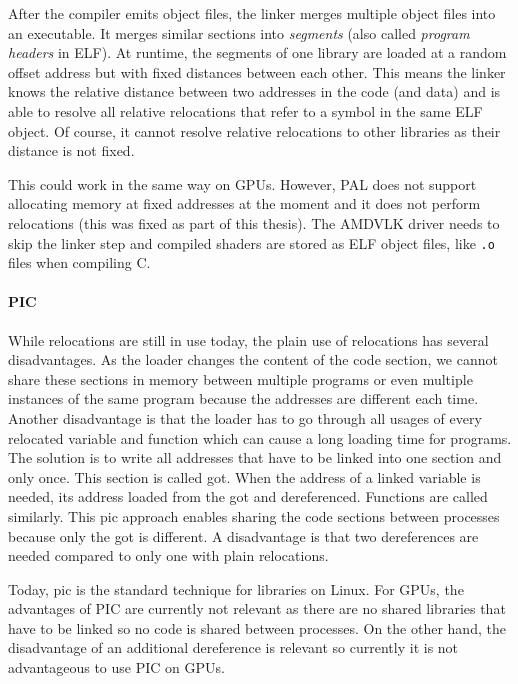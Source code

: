 After the compiler emits object files, the linker merges multiple object files into an executable. It merges similar sections into \emph{segments} (also called \emph{program headers} in ELF). At runtime, the segments of one library are loaded at a random offset address but with fixed distances between each other. This means the linker knows the relative distance between two addresses in the code (and data) and is able to resolve all relative relocations that refer to a symbol in the same ELF object. Of course, it cannot resolve relative relocations to other libraries as their distance is not fixed.

This could work in the same way on GPUs. However, PAL does not support allocating memory at fixed addresses at the moment and it does not perform relocations (this was fixed as part of this thesis). The AMDVLK driver needs to skip the linker step and compiled shaders are stored as ELF object files, like \texttt{.o} files when compiling C.

\paragraph{PIC} While relocations are still in use today, the plain use of relocations has several disadvantages. As the loader changes the content of the code section, we cannot share these sections in memory between multiple programs or even multiple instances of the same program because the addresses are different each time. Another disadvantage is that the loader has to go through all usages of every relocated variable and function which can cause a long loading time for programs. The solution is to write all addresses that have to be linked into one section and only once. This section is called \gls{got}. When the address of a linked variable is needed, its address loaded from the \gls{got} and dereferenced. Functions are called similarly. This \gls{pic} approach enables sharing the code sections between processes because only the \gls{got} is different. A disadvantage is that two dereferences are needed compared to only one with plain relocations.~\cite{BenderskyPic}

Today, \gls{pic} is the standard technique for libraries on Linux. For GPUs, the advantages of PIC are currently not relevant as there are no shared libraries that have to be linked so no code is shared between processes. On the other hand, the disadvantage of an additional dereference is relevant so currently it is not advantageous to use PIC on GPUs.